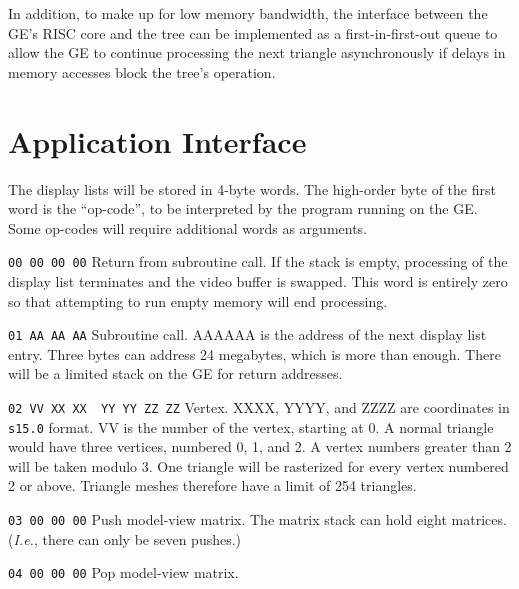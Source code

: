 \documentclass{book}
\begin{document}
In addition, to make up for low memory bandwidth, the interface
between the GE's RISC core and the tree can be implemented as a
first-in-first-out queue to allow the GE to continue processing the
next triangle asynchronously if delays in memory accesses block the
tree's operation.

\chapter{Application Interface}


The display lists will be stored in 4-byte words.  The high-order byte of
the first word is the ``op-code'', to be interpreted by the program running
on the GE.  Some op-codes will require additional words as arguments.

\begin{indented}{\tt 00 00 00 00}
Return from subroutine call.  If the stack is empty, processing of the
display list terminates and the video buffer is swapped.  This word
is entirely zero so that attempting to run empty memory will
end processing.
\end{indented}

\begin{indented}{\tt 01 AA AA AA}
Subroutine call.  AAAAAA is the address of the next display list entry.
Three bytes can address 24 megabytes, which is more than enough.  There
will be a limited stack on the GE for return addresses.
\end{indented}

\begin{indented}{\tt 02 VV XX XX \ YY YY ZZ ZZ}
Vertex.  XXXX, YYYY, and ZZZZ are coordinates in
{\tt s15.0} format.  VV
is the number of the vertex, starting at 0.   A normal triangle would
have three vertices, numbered 0, 1, and 2.  A vertex numbers greater than
2 will be taken modulo 3.  One triangle will be rasterized for every
vertex numbered 2 or above.  Triangle meshes therefore have a limit
of 254 triangles.
\end{indented}

\begin{indented}{\tt 03 00 00 00}
Push model-view matrix.  The matrix stack can hold eight matrices.
({\em I.e.}, there can only be seven pushes.)
\end{indented}

\begin{indented}{\tt 04 00 00 00}
Pop model-view matrix.
\end{indented}
\end{document}
